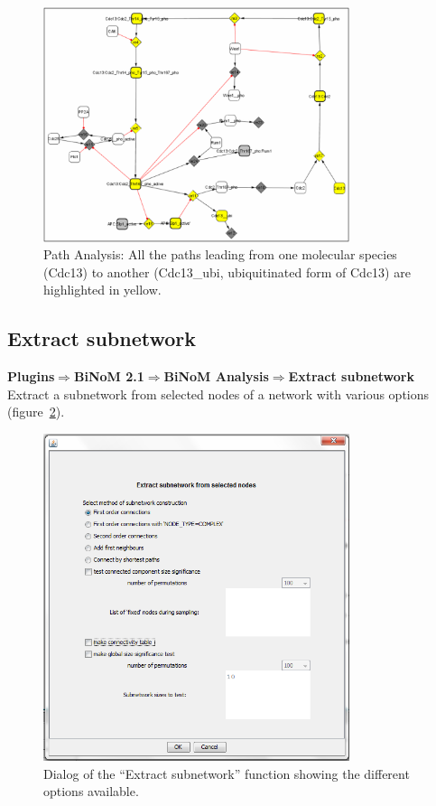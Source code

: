 \begin{figure}
\centering
\includegraphics[width=0.8\textwidth]{graphics/Path_Analysis_All_the_paths}
\caption{Path Analysis: All the paths leading from one molecular species (Cdc13) to another (Cdc13\_ubi, ubiquitinated form of Cdc13) are highlighted in yellow.}
\label{Path_Analysis_All_the_paths}
\end{figure}

\subsection{Extract subnetwork}
\textbf{Plugins$\Rightarrow$BiNoM 2.1$\Rightarrow$BiNoM Analysis$\Rightarrow$Extract subnetwork}\\
Extract a subnetwork from selected nodes of a network with various options (figure~\ref{Extract_subnetwork_dialog}).
\begin{figure}
\centering
\includegraphics[width=0.8\textwidth]{graphics/Extract_subnetwork_dialog}
\caption{Dialog of the ``Extract subnetwork'' function showing the different options available.}
\label{Extract_subnetwork_dialog}
\end{figure}

